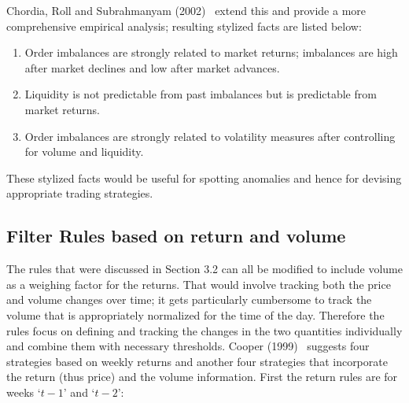 Chordia, Roll and Subrahmanyam (2002)~\cite{chorroll} extend this and provide a more comprehensive empirical analysis; resulting stylized facts are listed below:
	\begin{enumerate}[--]
	\item Order imbalances are strongly related to market returns; imbalances are high after market declines and low after market advances.
	\item Liquidity is not predictable from past imbalances but is predictable from market returns.
	\item Order imbalances are strongly related to volatility measures after controlling for volume and liquidity. 
	\end{enumerate}
These stylized facts would be useful for spotting anomalies and hence for devising appropriate trading strategies. 


\subsection{Filter Rules based on return and volume}


The rules that were discussed in Section 3.2  can all be modified to include volume as a weighing factor for the returns. That would involve tracking both the price and volume changes over time; it gets particularly cumbersome to track the volume that is appropriately normalized for the time of the day. Therefore the rules focus on defining and tracking the changes in the two quantities individually and combine them with necessary thresholds. Cooper (1999)~\cite{cooper} suggests four strategies based on weekly returns and another four strategies that incorporate the return (thus price) and the volume information. First the return rules are for weeks `$t-1$' and `$t-2$': \\

